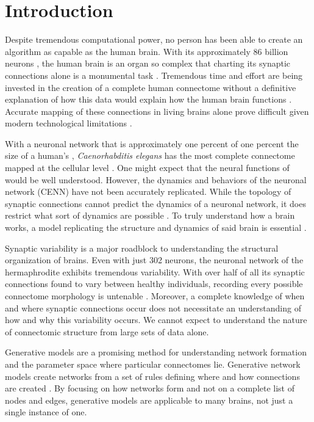 \section{Introduction}

Despite tremendous computational power, no person has been able to create an algorithm as capable as the human brain. 
With its approximately 86 billion neurons \citep{Azevedo}, the human brain is an organ so complex that charting its synaptic connections alone is a monumental task \citep{VanEssen}. 
Tremendous time and effort are being invested in the creation of a complete human connectome without a definitive explanation of how this data would explain how the human brain functions \citep{Ceylan, Rheault}. 
Accurate mapping of these connections in living brains alone prove difficult given modern technological limitations \citep{Rheault}. 

With a neuronal network that is approximately one percent of one percent the size of a human’s \citep{Azevedo}, \textit{Caenorhabditis elegans} has the most complete connectome mapped at the cellular level \citep{White}. 
One might expect that the neural functions of \ce would be well understood. 
However, the dynamics and behaviors of the \ce neuronal network (CENN) have not been accurately replicated. 
While the topology of synaptic connections cannot predict the dynamics of a neuronal network, it does restrict what sort of dynamics are possible \citep{Prinz}.
To truly understand how a brain works, a model replicating the structure and dynamics of said brain is essential \citep{Izquierdo}.

Synaptic variability is a major roadblock to understanding the structural organization of brains. 
Even with just 302 neurons, the neuronal network of the hermaphrodite \ce exhibits tremendous variability. 
With over half of all its synaptic connections found to vary between healthy individuals, recording every possible \ce connectome morphology is untenable \citep{Witvliet}.
Moreover, a complete knowledge of when and where synaptic connections  occur does not necessitate an understanding of how and why this variability occurs. 
We cannot expect to understand the nature of \ce connectomic structure from large sets of data alone.

Generative models are a promising method for understanding network formation and the parameter space where particular connectomes lie. 
Generative network models create networks from a set of rules defining where and how connections are created \citep{Betzel}. 
By focusing on how networks form and not on a complete list of nodes and edges, generative models are applicable to many brains, not just a single instance of one. 

